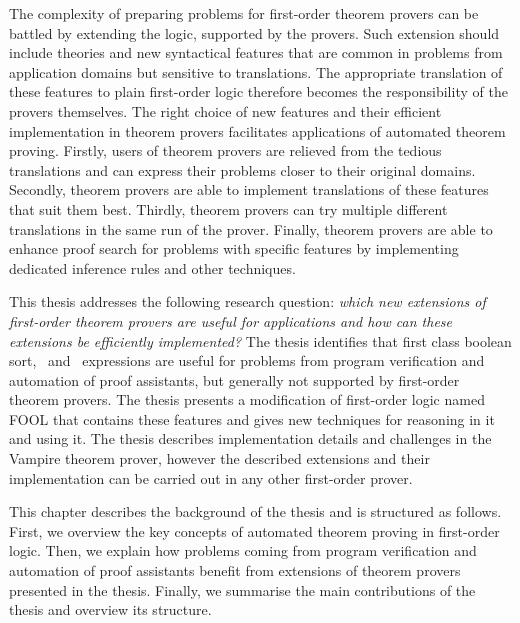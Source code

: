The complexity of preparing problems for first-order theorem provers can be battled by extending the logic, supported by the provers. Such extension should include theories and new syntactical features that are common in problems from application domains but sensitive to translations. The appropriate translation of these features to plain first-order logic therefore becomes the responsibility of the provers themselves. The right choice of new features and their efficient implementation in theorem provers facilitates applications of automated theorem proving. Firstly, users of theorem provers are relieved from the tedious translations and can express their problems closer to their original domains. Secondly, theorem provers are able to implement translations of these features that suit them best. Thirdly, theorem provers can try multiple different translations in the same run of the prover. Finally, theorem provers are able to enhance proof search for problems with specific features by implementing dedicated inference rules and other techniques.

This thesis addresses the following research question: \emph{which new extensions of first-order theorem provers are useful for applications and how can these extensions be efficiently implemented?} The thesis identifies that first class boolean sort, \ITE\ and \LETIN\ expressions are useful for problems from program verification and automation of proof assistants, but generally not supported by first-order theorem provers. The thesis presents a modification of first-order logic named FOOL that contains these features and gives new techniques for reasoning in it and using it. The thesis describes implementation details and challenges in the Vampire theorem prover, however the described extensions and their implementation can be carried out in any other first-order prover.

This chapter describes the background of the thesis and is structured as follows. First, we overview the key concepts of automated theorem proving in first-order logic. Then, we explain how problems coming from program verification and automation of proof assistants benefit from extensions of theorem provers presented in the thesis. Finally, we summarise the main contributions of the thesis and overview its structure.


